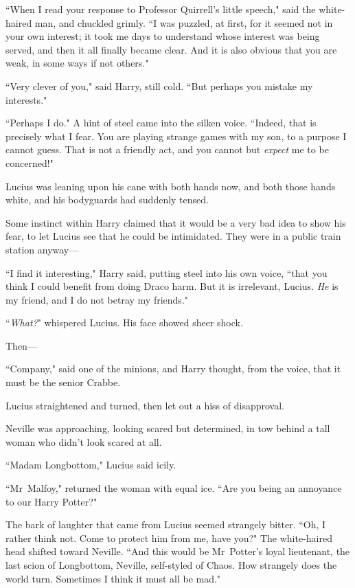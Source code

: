 ``When I read your response to Professor Quirrell's little speech," said the white-haired man, and chuckled grimly. ``I was puzzled, at first, for it seemed not in your own interest; it took me days to understand whose interest was being served, and then it all finally became clear. And it is also obvious that you are weak, in some ways if not others."

``Very clever of you," said Harry, still cold. ``But perhaps you mistake my interests."

``Perhaps I do." A hint of steel came into the silken voice. ``Indeed, that is precisely what I fear. You are playing strange games with my son, to a purpose I cannot guess. That is not a friendly act, and you cannot but \emph{expect} me to be concerned!"

Lucius was leaning upon his cane with both hands now, and both those hands white, and his bodyguards had suddenly tensed.

Some instinct within Harry claimed that it would be a very bad idea to show his fear, to let Lucius see that he could be intimidated. They were in a public train station anyway—

``I find it interesting," Harry said, putting steel into his own voice, ``that you think I could benefit from doing Draco harm. But it is irrelevant, Lucius. \emph{He} is my friend, and I do not betray my friends."

``\emph{What?}" whispered Lucius. His face showed sheer shock.

Then—

``Company," said one of the minions, and Harry thought, from the voice, that it must be the senior Crabbe.

Lucius straightened and turned, then let out a hiss of disapproval.

Neville was approaching, looking scared but determined, in tow behind a tall woman who didn't look scared at all.

``Madam Longbottom," Lucius said icily.

``Mr~Malfoy," returned the woman with equal ice. ``Are you being an annoyance to our Harry Potter?"

The bark of laughter that came from Lucius seemed strangely bitter. ``Oh, I rather think not. Come to protect him from me, have you?" The white-haired head shifted toward Neville. ``And this would be Mr~Potter's loyal lieutenant, the last scion of Longbottom, Neville, self-styled of Chaos. How strangely does the world turn. Sometimes I think it must all be mad."

